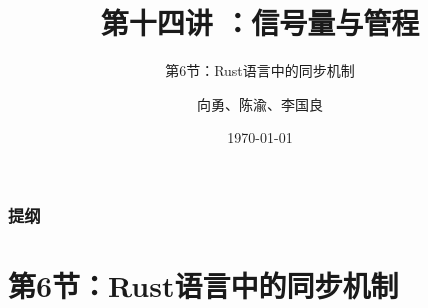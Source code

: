 


\title[第14讲]{第十四讲 ：信号量与管程} %
\subtitle{第6节：Rust语言中的同步机制}
\author{向勇、陈渝、李国良} %
\date{\today} %




\begin{frame}
\titlepage %
\end{frame}

\begin{frame}
\frametitle{提纲} %
\tableofcontents %
\end{frame}
\section{第6节：Rust语言中的同步机制} %

